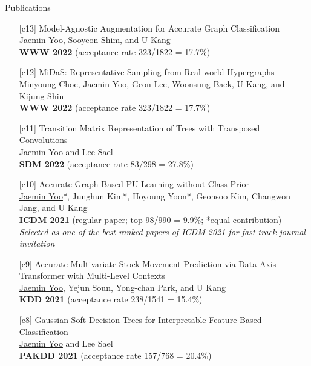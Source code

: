 \documentclass{resume} %
\begin{document}
\begin{rSection}{Publications}
\smallskip
\begin{enumerate}

	\item[{[c13]}]
		Model-Agnostic Augmentation for Accurate Graph Classification \\
		\underline{Jaemin Yoo}, Sooyeon Shim, and U Kang \\
		\textbf{WWW 2022} (acceptance rate 323/1822 = 17.7\%) \\

	\item[{[c12]}]
		MiDaS: Representative Sampling from Real-world Hypergraphs \\
		Minyoung Choe, \underline{Jaemin Yoo}, Geon Lee, Woonsung Baek, U Kang, and Kijung Shin \\
		\textbf{WWW 2022} (acceptance rate 323/1822 = 17.7\%) \\

	\item[{[c11]}]
		Transition Matrix Representation of Trees with Transposed Convolutions \\
		\underline{Jaemin Yoo} and Lee Sael \\
		\textbf{SDM 2022} (acceptance rate 83/298 = 27.8\%) \\

	\item[{[c10]}]
		Accurate Graph-Based PU Learning without Class Prior \\
		\underline{Jaemin Yoo}*, Junghun Kim*, Hoyoung Yoon*, Geonsoo Kim, Changwon Jang, and U Kang \\
		\textbf{ICDM 2021} (regular paper; top 98/990 = 9.9\%; *equal contribution) \\
		\emph{Selected as one of the best-ranked papers of ICDM 2021 for fast-track journal invitation}

	\item[{[c9]}]
		Accurate Multivariate Stock Movement Prediction via Data-Axis Transformer with Multi-Level Contexts  \\
		\underline{Jaemin Yoo}, Yejun Soun, Yong-chan Park, and U Kang \\
		\textbf{KDD 2021} (acceptance rate 238/1541 = 15.4\%)

	\item[{[c8]}]
		Gaussian Soft Decision Trees for Interpretable Feature-Based Classification \\
		\underline{Jaemin Yoo} and Lee Sael \\
		\textbf{PAKDD 2021} (acceptance rate 157/768 = 20.4\%)
		

\end{enumerate}
\end{rSection}
\end{document}
